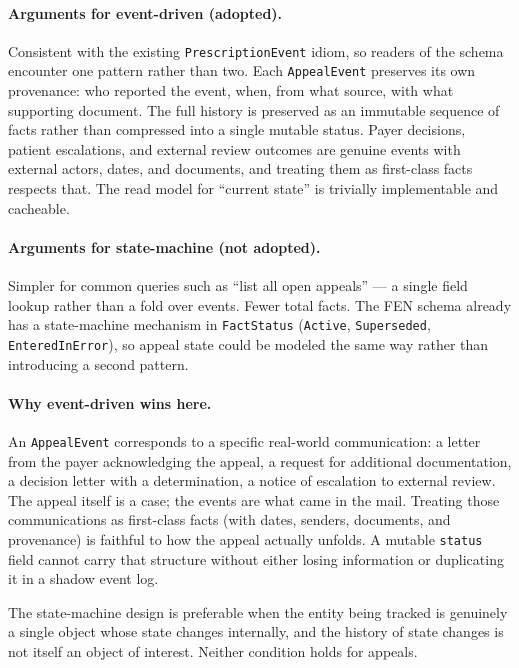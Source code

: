 \documentclass[11pt]{article}
\begin{document}
\paragraph{Arguments for event-driven (adopted).}
Consistent with the existing \texttt{PrescriptionEvent} idiom, so
readers of the schema encounter one pattern rather than two. Each
\texttt{AppealEvent} preserves its own provenance: who reported the
event, when, from what source, with what supporting document. The full
history is preserved as an immutable sequence of facts rather than
compressed into a single mutable status. Payer decisions, patient
escalations, and external review outcomes are genuine events with
external actors, dates, and documents, and treating them as first-class
facts respects that. The read model for ``current state'' is trivially
implementable and cacheable.

\paragraph{Arguments for state-machine (not adopted).}
Simpler for common queries such as ``list all open appeals'' --- a
single field lookup rather than a fold over events. Fewer total facts.
The FEN schema already has a state-machine mechanism in
\texttt{FactStatus} (\texttt{Active}, \texttt{Superseded},
\texttt{EnteredInError}), so appeal state could be modeled the same way
rather than introducing a second pattern.

\paragraph{Why event-driven wins here.}
An \texttt{AppealEvent} corresponds to a specific real-world
communication: a letter from the payer acknowledging the appeal, a
request for additional documentation, a decision letter with a
determination, a notice of escalation to external review. The appeal
itself is a case; the events are what came in the mail. Treating those
communications as first-class facts (with dates, senders, documents,
and provenance) is faithful to how the appeal actually unfolds. A
mutable \texttt{status} field cannot carry that structure without
either losing information or duplicating it in a shadow event log.

The state-machine design is preferable when the entity being tracked
is genuinely a single object whose state changes internally, and the
history of state changes is not itself an object of interest. Neither
condition holds for appeals.
\end{document}
